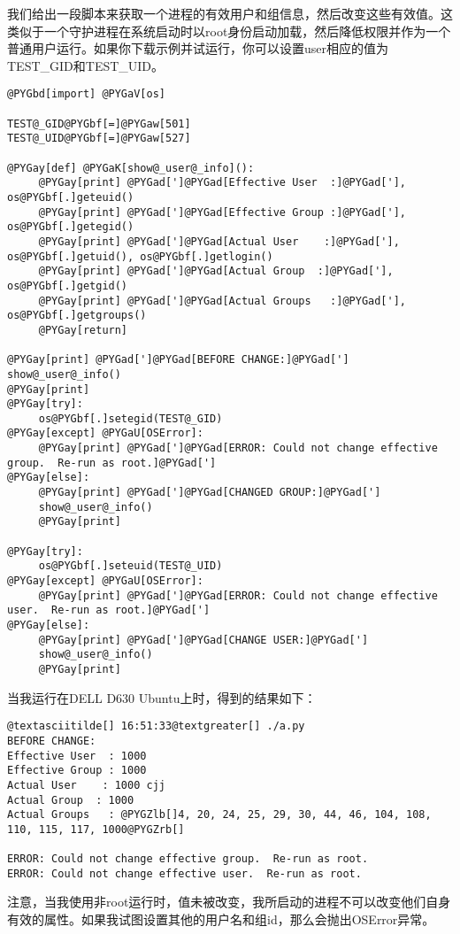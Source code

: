 \documentclass[letterpaper,10pt,english]{manual}
\begin{document}
我们给出一段脚本来获取一个进程的有效用户和组信息，然后改变这些有效值。这类似于一个守护进程在系统启动时以root身份启动加载，然后降低权限并作为一个普通用户运行。如果你下载示例并试运行，你可以设置user相应的值为TEST\_GID和TEST\_UID。

\begin{Verbatim}[commandchars=@\[\]]
@PYGbd[import] @PYGaV[os]

TEST@_GID@PYGbf[=]@PYGaw[501]
TEST@_UID@PYGbf[=]@PYGaw[527]

@PYGay[def] @PYGaK[show@_user@_info]():
     @PYGay[print] @PYGad[']@PYGad[Effective User  :]@PYGad['], os@PYGbf[.]geteuid()
     @PYGay[print] @PYGad[']@PYGad[Effective Group :]@PYGad['], os@PYGbf[.]getegid()
     @PYGay[print] @PYGad[']@PYGad[Actual User    :]@PYGad['], os@PYGbf[.]getuid(), os@PYGbf[.]getlogin()
     @PYGay[print] @PYGad[']@PYGad[Actual Group  :]@PYGad['], os@PYGbf[.]getgid()
     @PYGay[print] @PYGad[']@PYGad[Actual Groups   :]@PYGad['], os@PYGbf[.]getgroups()
     @PYGay[return]

@PYGay[print] @PYGad[']@PYGad[BEFORE CHANGE:]@PYGad[']
show@_user@_info()
@PYGay[print]
@PYGay[try]:
     os@PYGbf[.]setegid(TEST@_GID)
@PYGay[except] @PYGaU[OSError]:
     @PYGay[print] @PYGad[']@PYGad[ERROR: Could not change effective group.  Re-run as root.]@PYGad[']
@PYGay[else]:
     @PYGay[print] @PYGad[']@PYGad[CHANGED GROUP:]@PYGad[']
     show@_user@_info()
     @PYGay[print]

@PYGay[try]:
     os@PYGbf[.]seteuid(TEST@_UID)
@PYGay[except] @PYGaU[OSError]:
     @PYGay[print] @PYGad[']@PYGad[ERROR: Could not change effective user.  Re-run as root.]@PYGad[']
@PYGay[else]:
     @PYGay[print] @PYGad[']@PYGad[CHANGE USER:]@PYGad[']
     show@_user@_info()
     @PYGay[print]
\end{Verbatim}

当我运行在DELL D630 Ubuntu上时，得到的结果如下：

\begin{Verbatim}[commandchars=@\[\]]
@textasciitilde[] 16:51:33@textgreater[] ./a.py
BEFORE CHANGE:
Effective User  : 1000
Effective Group : 1000
Actual User    : 1000 cjj
Actual Group  : 1000
Actual Groups   : @PYGZlb[]4, 20, 24, 25, 29, 30, 44, 46, 104, 108, 110, 115, 117, 1000@PYGZrb[]

ERROR: Could not change effective group.  Re-run as root.
ERROR: Could not change effective user.  Re-run as root.
\end{Verbatim}

注意，当我使用非root运行时，值未被改变，我所启动的进程不可以改变他们自身有效的属性。如果我试图设置其他的用户名和组id，那么会抛出OSError异常。
\end{document}
